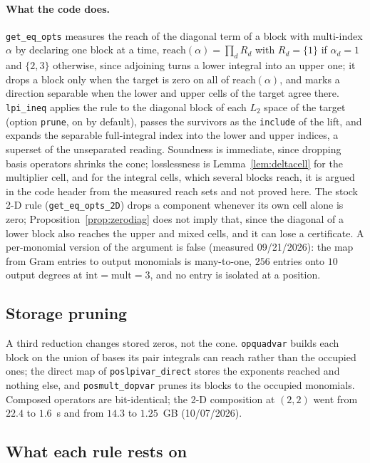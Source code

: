 \documentclass[12pt]{article}
\newcommand{\mrm}[1]{\mathrm{#1}}
\newcommand{\code}[1]{\texttt{#1}}
\theoremstyle{plain}
\theoremstyle{definition}
\theoremstyle{remark}
\begin{document}
\paragraph{What the code does.} \code{get\_eq\_opts} measures the reach of the diagonal term of a block with multi-index $\alpha$ by declaring one block at a time, $\mrm{reach}(\alpha)=\prod_dR_d$ with $R_d=\{1\}$ if $\alpha_d=1$ and $\{2,3\}$ otherwise, since adjoining turns a lower integral into an upper one; it drops a block only when the target is zero on all of $\mrm{reach}(\alpha)$, and marks a direction separable when the lower and upper cells of the target agree there. \code{lpi\_ineq} applies the rule to the diagonal block of each $L_2$ space of the target (option \code{prune}, on by default), passes the survivors as the \code{include} of the lift, and expands the separable full-integral index into the lower and upper indices, a superset of the unseparated reading. Soundness is immediate, since dropping basis operators shrinks the cone; losslessness is Lemma~\ref{lem:deltacell} for the multiplier cell, and for the integral cells, which several blocks reach, it is argued in the code header from the measured reach sets and not proved here. The stock 2-D rule (\code{get\_eq\_opts\_2D}) drops a component whenever its own cell alone is zero; Proposition~\ref{prop:zerodiag} does not imply that, since the diagonal of a lower block also reaches the upper and mixed cells, and it can lose a certificate. A per-monomial version of the argument is false (measured 09/21/2026): the map from Gram entries to output monomials is many-to-one, $256$ entries onto $10$ output degrees at $\mrm{int}=\mrm{mult}=3$, and no entry is isolated at a position.

\subsection{Storage pruning}

A third reduction changes stored zeros, not the cone. \code{opquadvar} builds each block on the union of bases its pair integrals can reach rather than the occupied ones; the direct map of \code{poslpivar\_direct} stores the exponents reached and nothing else, and \code{posmult\_dopvar} prunes its blocks to the occupied monomials. Composed operators are bit-identical; the 2-D composition at $(2,2)$ went from $22.4$ to $1.6$~s and from $14.3$ to $1.25$~GB (10/07/2026).

\subsection{What each rule rests on}
\end{document}
